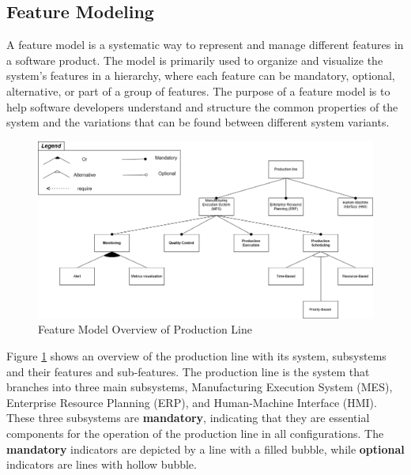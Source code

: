 \subsection{Feature Modeling} %

A feature model is a systematic way to represent and manage different features in a software product. %
The model is primarily used to organize and visualize the system's features in a hierarchy, where each feature can be mandatory, optional, alternative, or part of a group of features. The purpose of a feature model is to help software developers understand and structure the common properties of the system and the variations that can be found between different system variants\cite{featuremodels2023}.

\begin{figure}[hbt]
    \centering
    \caption{Feature Model Overview of Production Line}
    \label{fig:feature-model}
    \includegraphics[width=1\linewidth]{images/feature_modelling.png}
\end{figure}

Figure \ref{fig:feature-model} shows an overview of the production line with its system, subsystems and their features and sub-features. The production line is the system that branches into three main subsystems, Manufacturing Execution System (MES), Enterprise Resource Planning (ERP), and Human-Machine Interface (HMI). These three subsystems are \textbf{mandatory}, indicating that they are essential components for the operation of the production line in all configurations. The \textbf{mandatory} indicators are depicted by a line with a filled bubble, while \textbf{optional} indicators are lines with hollow bubble.

